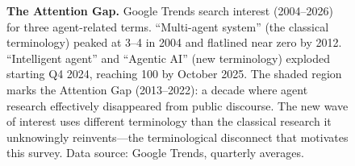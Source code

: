 \begin{figure}[t]
\caption{\textbf{The Attention Gap.} Google Trends search interest
(2004--2026) for three agent-related terms. ``Multi-agent system''
(the classical terminology) peaked at 3--4 in 2004 and flatlined near
zero by 2012. ``Intelligent agent'' and ``Agentic AI'' (new terminology)
exploded starting Q4 2024, reaching 100 by October 2025. The shaded
region marks the Attention Gap (2013--2022): a decade where agent research
effectively disappeared from public discourse. The new wave of interest
uses different terminology than the classical research it unknowingly
reinvents---the terminological disconnect that motivates this survey.
Data source: Google Trends, quarterly averages.}
\label{fig:trends}
\end{figure}
